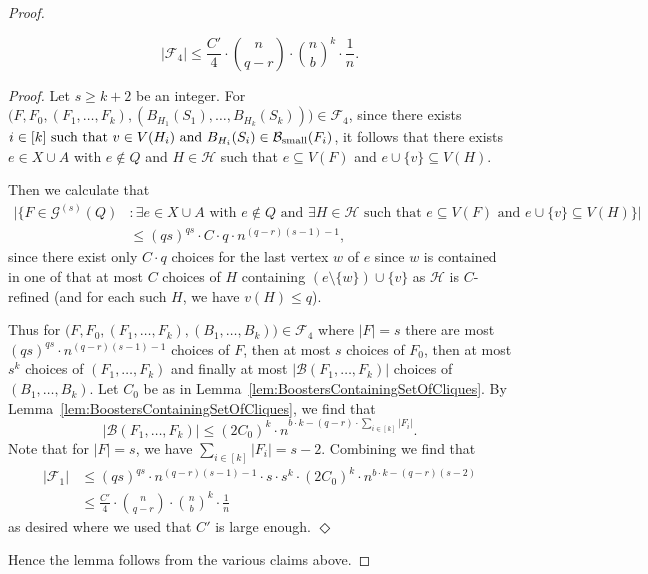 \documentclass[11pt]{article}
\newcommand{\mc}[1]{\mathcal{#1}}
\newcounter{i}
\theoremstyle{plain}
\newenvironment{proofclaim}[1][]%
{\noindent \emph{Proof.} {}{#1}{}}{\hfill
	$\Diamond$\vspace{1em}}
\renewcommand{\theclaim}{\thetheorem.\arabic{claim}}
\newenvironment{nonlateproof}[1]
 {%
  \renewcommand{\theclaim}{\ref{#1}.\arabic{claim}}%
  \begin{proof}%
 }
 {\end{proof}}
\theoremstyle{plain} %
\theoremstyle{definition}
\begin{document}
\begin{nonlateproof}{lem:UncommonDegree}
\begin{claim}
$$|\mc{F}_4| \le \frac{C'}{4} \cdot \binom{n}{q-r}\cdot \binom{n}{b}^k \cdot \frac{1}{n}.$$    
\end{claim}
\begin{proofclaim}
Let $s\ge k+2$ be an integer. For $\bigg(F, F_0, (F_1,\dots, F_k), (B_{H_1}(S_1),\ldots, B_{H_k}(S_k))\bigg)\in \mc{F}_4$, since there exists $i\in [k] \text{ such that } v\in V(H_i) \text { and }B_{H_i}(S_i)\in \mc{B}_{\rm small}(F_i)$, it follows that there exists $e\in X\cup A$ with $e\not\in Q$ and $H\in \mc{H}$ such that $e\subseteq V(F)$ and $e\cup \{v\} \subseteq V(H)$. 

Then we calculate that
\begin{align*}
|\{F\in \mc{G}^{(s)}(Q)&: \exists e\in X\cup A \text{ with } e\not\in Q \text{ and } \exists H\in \mc{H} \text{ such that } e\subseteq V(F)\text{ and }e\cup \{v\} \subseteq V(H)\}| \\
&\le (qs)^{qs} \cdot C\cdot q\cdot n^{(q-r)(s-1)-1},    
\end{align*}
since there exist only $C\cdot q$ choices for the last vertex $w$ of $e$ since $w$ is contained in one of that at most $C$ choices of $H$ containing $(e\setminus \{w\})\cup \{v\}$ as $\mc{H}$ is $C$-refined (and for each such $H$, we have $v(H)\le q$). 

Thus for $\bigg(F, F_0, (F_1,\dots, F_k), (B_1,\ldots, B_k)\bigg)\in \mc{F}_4$ where $|F|=s$ there are most $(qs)^{qs} \cdot n^{(q-r)(s-1)-1}$ choices of $F$, then at most $s$ choices of $F_0$, then at most $s^k$ choices of $(F_1,\dots, F_k)$ and finally at most $|\mc{B}(F_1,\ldots, F_k)|$ choices of $(B_1,\ldots, B_k)$. Let $C_0$ be as in Lemma~\ref{lem:BoostersContainingSetOfCliques}. By Lemma~\ref{lem:BoostersContainingSetOfCliques}, we find that
$$|\mc{B}(F_1,\ldots, F_{k})| \le (2C_0)^{k}\cdot n^{b\cdot k-(q-r)\cdot \sum_{i\in [k]} |F_i|}.$$
Note that for $|F|=s$, we have $\sum_{i\in [k]} |F_i|=s-2$. Combining we find that
\begin{align*}
|\mc{F}_1| &\le (qs)^{qs} \cdot n^{(q-r)(s-1)-1}\cdot s \cdot s^k \cdot (2C_0)^{k}\cdot n^{b\cdot k-(q-r)(s-2)} \\
&\le \frac{C'}{4} \cdot \binom{n}{q-r}\cdot \binom{n}{b}^k \cdot \frac{1}{n}
\end{align*}
as desired where we used that $C'$ is large enough.
\end{proofclaim}

\noindent Hence the lemma follows from the various claims above.
\end{nonlateproof}
\end{document}
